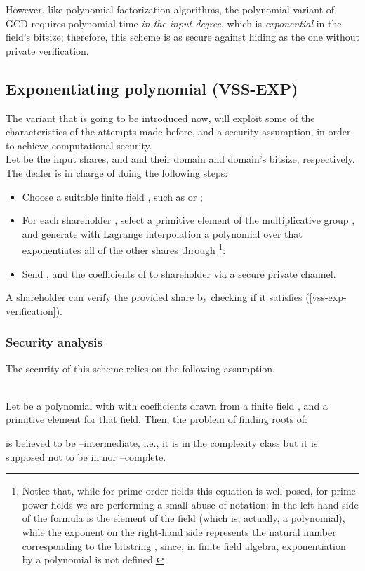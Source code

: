 \documentclass[10pt,journal,cspaper,compsoc]{IEEEtran}
\begin{document}
However, like polynomial factorization algorithms, the polynomial variant of GCD requires polynomial-time \emph{in the input degree}, which is \emph{exponential} in the field's bitsize; therefore, this scheme is as secure against hiding as the one without private verification.

\subsection{Exponentiating polynomial (VSS-EXP)}
The variant that is going to be introduced now, will exploit some of the characteristics of the attempts made before, and a security assumption, in order to achieve computational security.\\

Let  be the input shares, and  and  their domain and domain's bitsize, respectively. The dealer is in charge of doing the following steps:

\begin{itemize}
\item Choose a suitable finite field , such as  or ;
\item For each shareholder , select a primitive element  of the multiplicative group , and generate with Lagrange interpolation a polynomial  over  that exponentiates all of the other shares through \footnote{Notice that, while for prime order fields  this equation is well-posed, for prime power fields  we are performing a small abuse of notation:  in the left-hand side of the formula is the element of the field (which is, actually, a polynomial), while the exponent on the right-hand side represents the natural number corresponding to the bitstring , since, in finite field algebra, exponentiation by a polynomial is not defined.}:

\item Send ,  and the coefficients of  to shareholder  via a secure private channel.
\end{itemize}

A shareholder can verify the provided share by checking if it satisfies (\ref{vss-exp-verification}).

\subsubsection{Security analysis}
The security of this scheme relies on the following assumption.

\begin{defn}~\\
Let  be a polynomial with  with coefficients drawn from a finite field , and  a primitive element for that field. Then, the problem of finding roots of:

is believed to be --intermediate, i.e., it is in the complexity class  but it is supposed not to be in  nor --complete.
\end{defn}
\end{document}
